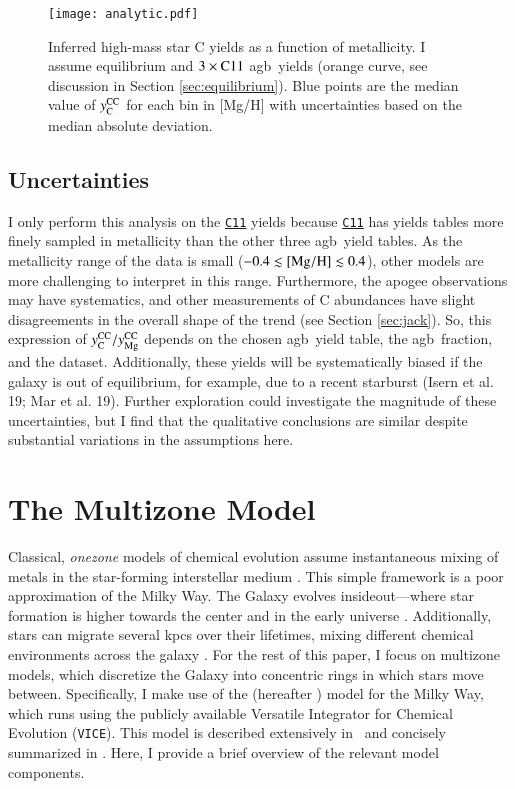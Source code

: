 \documentclass[12pt,oneside,letterpaper]{report}
\newcommand{\agb}{\gls{agb}}
\newcommand{\apogee}{\gls{apogee}}
\newcommand{\cxi}{\texttt{\hyperlink{C11}{C11}}}
\newcommand{\JJ}{\citetalias{james+21}}
\newcommand{\VICE}{\texttt{VICE}}
\newcommand{\Ycc}{\ensuremath{y_{\rm C}^{\rm CC}}}
\newcommand{\Yoc}{\ensuremath{y_{\rm Mg}^{\rm CC}}}
\begin{document}
\begin{figure}[htp]
    \centering
    \texttt{[image: analytic.pdf]}
    \caption[Reverse-Fit Yields]{Inferred high-mass star C yields as a function of metallicity. I assume equilibrium and $3\times {\rm C11}$ \agb\ yields (orange curve, see discussion in Section \ref{sec:equilibrium}). Blue points are the median value of $\Ycc$ for each bin in [Mg/H] with uncertainties based on the median absolute deviation.
    }
    \label{fig:analytic}
\end{figure}





\section{Uncertainties}

I only perform this analysis on the \cxi{} yields because \cxi{} has yields tables more finely sampled in metallicity than the other three \agb\ yield tables. As the metallicity range of the data is small ($-0.4\lesssim {\rm [Mg/H]} \lesssim 0.4$), other models are more challenging to interpret in this range. Furthermore, the \apogee{} observations may have systematics, and other measurements of C abundances \citep[e.g.][]{vincenzo+21} have slight disagreements in the overall shape of the trend (see Section \ref{sec:jack}).
So, this expression of $\Ycc/\Yoc$ depends on the chosen \agb\ yield table, the \agb\ fraction, and the dataset. 
Additionally, these yields will be systematically biased if the galaxy is out of equilibrium, for example, due to a recent starburst (Isern et al. 19; Mar et al. 19). Further exploration could investigate the magnitude of these uncertainties, but I find that the qualitative conclusions are similar despite substantial variations in the assumptions here.



\chapter{The Multizone Model}\label{sec:vice}

Classical, \textit{\gls{onezone}} models of chemical evolution assume instantaneous mixing of metals in the star-forming interstellar medium \citep[e.g.][]{matteucci21}. This simple framework is a poor approximation of the Milky Way.  The Galaxy evolves \gls{insideout}---where star formation is higher towards the center and in the early universe \citep{bird+13}. Additionally, stars can migrate several kpcs over their lifetimes, mixing different chemical environments across the galaxy \citep{bird+12,sellwood+binney02}. For the rest of this paper, I focus on \gls{multizone} models, which discretize the Galaxy into concentric rings in which stars move between.  Specifically, I make use of the \citet{james+21} (hereafter \JJ) model for the Milky Way, which runs using the publicly available Versatile Integrator for Chemical Evolution (\VICE). This model is described extensively in \JJ~and concisely summarized  in \citet{james+23}. Here, I provide a brief overview of the relevant model components.
\end{document}
